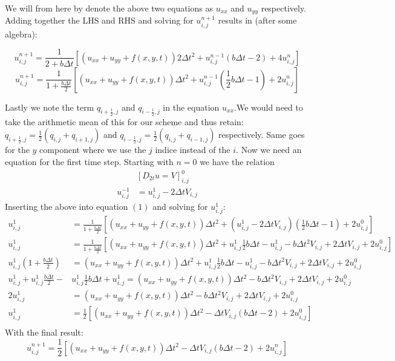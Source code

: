 \documentclass{article}
\newcommand{\beq}{\begin{equation}}
\newcommand{\eeq}{\end{equation}}
\begin{document}
We will from here by denote the above two equations as $u_{xx}$ and $u_{yy}$ respectively. 
Adding together the LHS and RHS and solving for $u^{n+1}_{i,j}$ results in (after some algebra):

$$u^{n+1}_{i,j} = \frac{1}{2+b\Delta t}\left[(u_{xx} + u_{yy} + f(x,y,t))2\Delta t^2 + u^{n-1}_{i,j}(b\Delta t - 2) + 4 u^{n}_{i,j}\right] $$
\beq u^{n+1}_{i,j} = \frac{1}{1+\frac{b\Delta t}{2}}\left[(u_{xx} + u_{yy} + f(x,y,t))\Delta t^2 + u^{n-1}_{i,j}(\frac{1}{2}b\Delta t - 1) + 2 u^{n}_{i,j}\right] \eeq


Lastly we note the term $q_{i+\frac{1}{2},j}$ and $q_{i-\frac{1}{2},j}$ in the equation $u_{xx}$.We would need to take the arithmetic mean of this for our scheme and thus retain: $q_{i+\frac{1}{2},j} = \frac{1}{2}(q_{i,j} + q_{i+1,j})$ and $q_{i-\frac{1}{2},j}=\frac{1}{2}(q_{i,j} + q_{i-1,j})$ respectively. Same goes for the $y$ component where we use the $j$ indice instead of the $i$.
\newpage
Now we need an equation for the first time step. Starting with $n=0$ we have the relation
\begin{align*}
& \left[D_{2t}u  = V\right]^0_{i,j} \\
u^{-1}_{i,j} & = u^1_{i,j} -2\Delta tV_{i,j}
\end{align*}
Inserting the above into equation $(1)$ and solving for $u^1_{i,j}$:
\begin{align*}
u^{1}_{i,j} &= \frac{1}{1+\frac{b\Delta t}{2}}\left[(u_{xx} + u_{yy} + f(x,y,t))\Delta t^2 + (u^1_{i,j} -2\Delta tV_{i,j})(\frac{1}{2}b\Delta t - 1) + 2 u^{0}_{i,j}\right]\\
u^{1}_{i,j} &= \frac{1}{1+\frac{b\Delta t}{2}}\left[(u_{xx} + u_{yy} + f(x,y,t))\Delta t^2 + u^1_{i,j}\frac{1}{2}b\Delta t - u^1_{i,j} - b\Delta t^2V_{i,j} + 2\Delta tV_{i,j} + 2 u^{0}_{i,j}\right]\\
u^{1}_{i,j}\left(1+\frac{b\Delta t}{2}\right) &= (u_{xx} + u_{yy} + f(x,y,t))\Delta t^2 + u^1_{i,j}\frac{1}{2}b\Delta t - u^1_{i,j} - b\Delta t^2V_{i,j} + 2\Delta tV_{i,j} + 2 u^{0}_{i,j}\\
u^{1}_{i,j}+u^{1}_{i,j}\frac{b\Delta t}{2}- &u^1_{i,j}\frac{1}{2}b\Delta t + u^1_{i,j} = (u_{xx} + u_{yy} + f(x,y,t))\Delta t^2  - b\Delta t^2V_{i,j} + 2\Delta tV_{i,j} + 2 u^{0}_{i,j}\\
2u^{1}_{i,j} &= (u_{xx} + u_{yy} + f(x,y,t))\Delta t^2  - b\Delta t^2V_{i,j} + 2\Delta tV_{i,j} + 2 u^{0}_{i,j}\\
u^{1}_{i,j} &= \frac{1}{2}\left[(u_{xx} + u_{yy} + f(x,y,t))\Delta t^2  - \Delta tV_{i,j}(b\Delta t - 2) + 2 u^{0}_{i,j}\right]\\
\end{align*}
With the final result:
$$u^{n+1}_{i,j} = \frac{1}{2}\left[(u_{xx} + u_{yy} + f(x,y,t))\Delta t^2  - \Delta tV_{i,j}(b\Delta t - 2) + 2 u^{n}_{i,j}\right]$$
\end{document}
